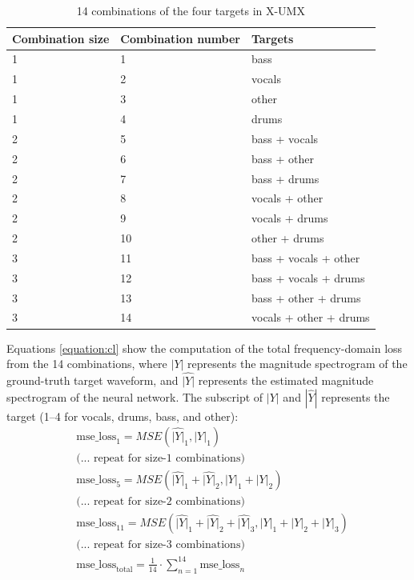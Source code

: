 \documentclass[report.tex]{subfiles}
\begin{document}
\begin{table}[ht]
	\centering
	\caption{14 combinations of the four targets in X-UMX}
	\label{table:14targets}
	\begin{tabular}{ |l|l|l| }
	 \hline
		Combination size & Combination number & Targets \\
	 \hline
	 \hline
	 	1 & 1 & bass \\
	 \hline
	 	1 & 2 & vocals \\
	 \hline
	 	1 & 3 & other \\
	 \hline
	 	1 & 4 & drums \\
	 \hline
	 	2 & 5 & bass + vocals \\
	 \hline
	 	2 & 6 & bass + other \\
	 \hline
	 	2 & 7 & bass + drums \\
	 \hline
	 	2 & 8 & vocals + other \\
	 \hline
	 	2 & 9 & vocals + drums \\
	 \hline
	 	2 & 10 & other + drums \\
	 \hline
	 	3 & 11 & bass + vocals + other \\
	 \hline
	 	3 & 12 & bass + vocals + drums \\
	 \hline
	 	3 & 13 & bass + other + drums \\
	 \hline
	 	3 & 14 & vocals + other + drums \\
	 \hline
\end{tabular}
\end{table}

Equations \eqref{equation:cl} show the computation of the total frequency-domain loss from the 14 combinations, where $|Y|$ represents the magnitude spectrogram of the ground-truth target waveform, and $\hat{|Y|}$ represents the estimated magnitude spectrogram of the neural network. The subscript of $|Y|$ and $|\hat{Y}|$ represents the target (1--4 for vocals, drums, bass, and other):
\begin{align}\tag{34}\label{equation:cl}
	\nonumber & \text{mse\_loss}_{1} = \mathit{MSE}(\hat{|Y|}_{1}, |Y|_{1})\\
	\nonumber & \text{(... repeat for size-1 combinations)}\\
	\nonumber & \text{mse\_loss}_{5} = \mathit{MSE}(\hat{|Y|}_{1} + \hat{|Y|}_{2}, |Y|_{1} + |Y|_{2})\\
	\nonumber & \text{(... repeat for size-2 combinations)}\\
	\nonumber & \text{mse\_loss}_{11} = \mathit{MSE}(\hat{|Y|}_{1} + \hat{|Y|}_{2} + \hat{|Y|}_{3}, |Y|_{1} + |Y|_{2} + |Y|_{3})\\
	\nonumber & \text{(... repeat for size-3 combinations)}\\
	\nonumber & \text{mse\_loss}_{\text{total}} = \frac{1}{14} \cdot \sum_{n = 1}^{14}{\text{mse\_loss}_{n}}
\end{align}
\end{document}
